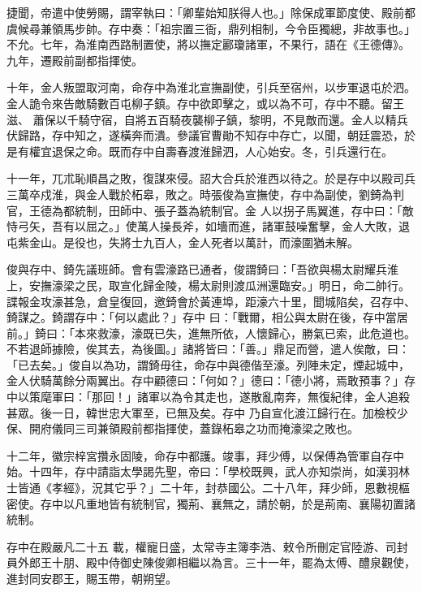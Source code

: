 \begin{pinyinscope}
 捷聞，帝遣中使勞賜，謂宰執曰：「卿輩始知朕得人也。」除保成軍節度使、殿前都虞候尋兼領馬步帥。存中奏：「祖宗置三衙，鼎列相制，今令臣獨總，非故事也。」不允。七年，為淮南西路制置使，將以撫定酈瓊諸軍，不果行，語在《王德傳》。九年，遷殿前副都指揮使。



 十年，金人叛盟取河南，命存中為淮北宣撫副使，引兵至宿州，以步軍退屯於泗。金人詭令來告敵騎數百屯柳子鎮。存中欲即擊之，或以為不可，存中不聽。留王滋、
 蕭保以千騎守宿，自將五百騎夜襲柳子鎮，黎明，不見敵而還。金人以精兵伏歸路，存中知之，遂橫奔而潰。參議官曹勛不知存中存亡，以聞，朝廷震恐，於是有權宜退保之命。既而存中自壽春渡淮歸泗，人心始安。冬，引兵還行在。



 十一年，兀朮恥順昌之敗，復謀來侵。詔大合兵於淮西以待之。於是存中以殿司兵三萬卒戍淮，與金人戰於柘皋，敗之。時張俊為宣撫使，存中為副使，劉錡為判官，王德為都統制，田師中、張子蓋為統制官。金
 人以拐子馬翼進，存中曰：「敵恃弓矢，吾有以屈之。」使萬人操長斧，如墻而進，諸軍鼓噪奮擊，金人大敗，退屯紫金山。是役也，失將士九百人，金人死者以萬計，而濠圍猶未解。



 俊與存中、錡先議班師。會有雲濠路已通者，俊謂錡曰：「吾欲與楊太尉耀兵淮上，安撫濠梁之民，取宣化歸金陵，楊太尉則渡瓜洲還臨安。」明日，命二帥行。諜報金攻濠甚急，倉皇復回，邀錡會於黃連埠，距濠六十里，聞城陷矣，召存中、錡謀之。錡謂存中：「何以處此？」存中
 曰：「戰爾，相公與太尉在後，存中當居前。」錡曰：「本來救濠，濠既已失，進無所依，人懷歸心，勝氣已索，此危道也。不若退師據險，俟其去，為後圖。」諸將皆曰：「善。」鼎足而營，遣人俟敵，曰：「已去矣。」俊自以為功，謂錡毋往，命存中與德偕至濠。列陣未定，煙起城中，金人伏騎萬餘分兩翼出。存中顧德曰：「何如？」德曰：「德小將，焉敢預事？」存中以策麾軍曰：「那回！」諸軍以為令其走也，遂散亂南奔，無復紀律，金人追殺甚眾。後一日，韓世忠大軍至，已無及矣。存中
 乃自宣化渡江歸行在。加檢校少保、開府儀同三司兼領殿前都指揮使，蓋錄柘皋之功而掩濠梁之敗也。



 十二年，徽宗梓宮攢永固陵，命存中都護。竣事，拜少傅，以保傅為管軍自存中始。十四年，存中請詣太學謁先聖，帝曰：「學校既興，武人亦知崇尚，如漢羽林士皆通《孝經》，況其它乎？」二十年，封恭國公。二十八年，拜少師，恩數視樞密使。存中以凡重地皆有統制官，獨荊、襄無之，請於朝，於是荊南、襄陽初置諸統制。



 存中在殿嚴凡二十五
 載，權寵日盛，太常寺主簿李浩、敕令所刪定官陸游、司封員外郎王十朋、殿中侍御史陳俊卿相繼以為言。三十一年，罷為太傅、醴泉觀使，進封同安郡王，賜玉帶，朝朔望。




\end{pinyinscope}
